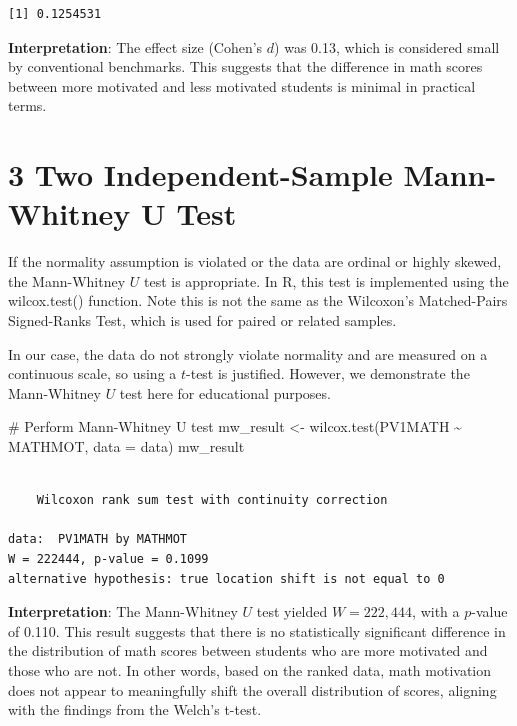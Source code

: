 \documentclass[
  letterpaper,
  DIV=11,
  numbers=noendperiod]{scrreprt}
\newenvironment{Shaded}{\begin{snugshade}}{\end{snugshade}}
\newcommand{\AttributeTok}[1]{\textcolor[rgb]{0.40,0.45,0.13}{#1}}
\newcommand{\CommentTok}[1]{\textcolor[rgb]{0.37,0.37,0.37}{#1}}
\newcommand{\FunctionTok}[1]{\textcolor[rgb]{0.28,0.35,0.67}{#1}}
\newcommand{\NormalTok}[1]{\textcolor[rgb]{0.00,0.23,0.31}{#1}}
\newcommand{\OtherTok}[1]{\textcolor[rgb]{0.00,0.23,0.31}{#1}}
\newcommand{\SpecialCharTok}[1]{\textcolor[rgb]{0.37,0.37,0.37}{#1}}
\begin{document}
\begin{verbatim}
[1] 0.1254531
\end{verbatim}

\textbf{Interpretation}: The effect size (Cohen's \(d\)) was 0.13, which
is considered small by conventional benchmarks. This suggests that the
difference in math scores between more motivated and less motivated
students is minimal in practical terms.

\section*{3 Two Independent-Sample Mann-Whitney U
Test}\label{two-independent-sample-mann-whitney-u-test-1}


If the normality assumption is violated or the data are ordinal or
highly skewed, the Mann-Whitney \(U\) test is appropriate. In R, this
test is implemented using the wilcox.test() function. Note this is not
the same as the Wilcoxon's Matched-Pairs Signed-Ranks Test, which is
used for paired or related samples.

In our case, the data do not strongly violate normality and are measured
on a continuous scale, so using a \(t\)-test is justified. However, we
demonstrate the Mann-Whitney \(U\) test here for educational purposes.

\begin{Shaded}
\begin{Highlighting}[]
\CommentTok{\# Perform Mann{-}Whitney U test }
\NormalTok{mw\_result }\OtherTok{\textless{}{-}} \FunctionTok{wilcox.test}\NormalTok{(PV1MATH }\SpecialCharTok{\textasciitilde{}}\NormalTok{ MATHMOT, }\AttributeTok{data =}\NormalTok{ data) }
\NormalTok{mw\_result }
\end{Highlighting}
\end{Shaded}

\begin{verbatim}

    Wilcoxon rank sum test with continuity correction

data:  PV1MATH by MATHMOT
W = 222444, p-value = 0.1099
alternative hypothesis: true location shift is not equal to 0
\end{verbatim}

\textbf{Interpretation}: The Mann-Whitney \(U\) test yielded
\(W = 222,444\), with a \(p\)-value of 0.110. This result suggests that
there is no statistically significant difference in the distribution of
math scores between students who are more motivated and those who are
not. In other words, based on the ranked data, math motivation does not
appear to meaningfully shift the overall distribution of scores,
aligning with the findings from the Welch's t-test.
\end{document}
